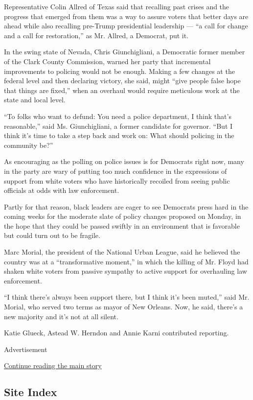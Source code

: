 Representative Colin Allred of Texas said that recalling past crises and
the progress that emerged from them was a way to assure voters that
better days are ahead while also recalling pre-Trump presidential
leadership --- ``a call for change and a call for restoration,'' as Mr.
Allred, a Democrat, put it.

In the swing state of Nevada, Chris Giunchigliani, a Democratic former
member of the Clark County Commission, warned her party that incremental
improvements to policing would not be enough. Making a few changes at
the federal level and then declaring victory, she said, might ``give
people false hope that things are fixed,'' when an overhaul would
require meticulous work at the state and local level.

``To folks who want to defund: You need a police department, I think
that's reasonable,'' said Ms. Giunchigliani, a former candidate for
governor. ``But I think it's time to take a step back and work on: What
should policing in the community be?''

As encouraging as the polling on police issues is for Democrats right
now, many in the party are wary of putting too much confidence in the
expressions of support from white voters who have historically recoiled
from seeing public officials at odds with law enforcement.

Partly for that reason, black leaders are eager to see Democrats press
hard in the coming weeks for the moderate slate of policy changes
proposed on Monday, in the hope that they could be passed swiftly in an
environment that is favorable but could turn out to be fragile.

Marc Morial, the president of the National Urban League, said he
believed the country was at a ``transformative moment,'' in which the
killing of Mr. Floyd had shaken white voters from passive sympathy to
active support for overhauling law enforcement.

``I think there's always been support there, but I think it's been
muted,'' said Mr. Morial, who served two terms as mayor of New Orleans.
Now, he said, there's a new majority and it's not at all silent.

Katie Glueck, Astead W. Herndon and Annie Karni contributed reporting.

Advertisement

\protect\hyperlink{after-bottom}{Continue reading the main story}

\hypertarget{site-index}{%
\subsection{Site Index}\label{site-index}}

